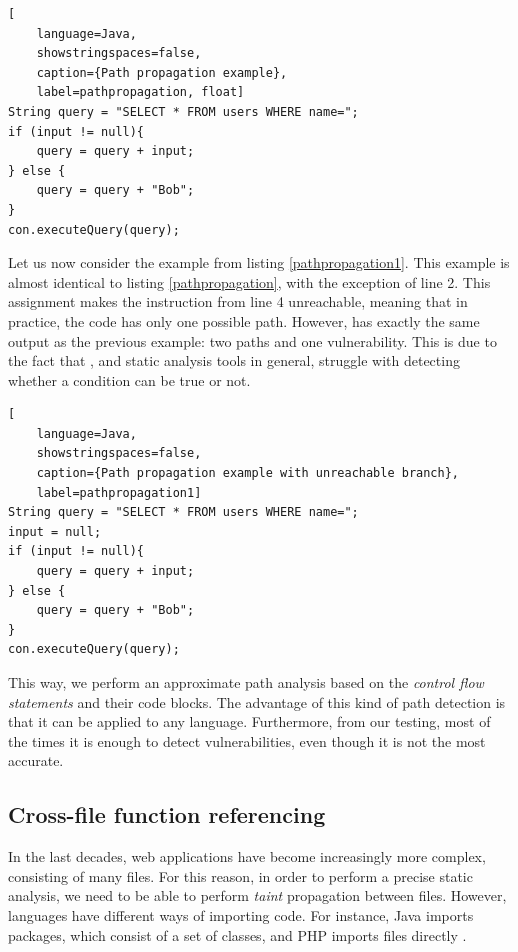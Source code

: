\begin{lstlisting}[
    language=Java,
    showstringspaces=false,
    caption={Path propagation example},
    label=pathpropagation, float] 
String query = "SELECT * FROM users WHERE name=";
if (input != null){
    query = query + input;
} else {
    query = query + "Bob";
}
con.executeQuery(query);
\end{lstlisting}

Let us now consider the example from listing \ref{pathpropagation1}. This example is almost identical to listing \ref{pathpropagation}, with the exception of line 2. This assignment makes the instruction from line 4 unreachable, meaning that in practice, the code has only one possible path. However, \toolname{} has exactly the same output as the previous example: two paths and one vulnerability. This is due to the fact that \toolname{}, and static analysis tools in general, struggle with detecting whether a condition can be true or not.

\begin{lstlisting}[
    language=Java,
    showstringspaces=false,
    caption={Path propagation example with unreachable branch},
    label=pathpropagation1] 
String query = "SELECT * FROM users WHERE name=";
input = null;
if (input != null){
    query = query + input;
} else {
    query = query + "Bob";
}
con.executeQuery(query);
\end{lstlisting}

This way, we perform an approximate path analysis based on the \textit{control flow statements} and their code blocks. The advantage of this kind of path detection is that it can be applied to any language. Furthermore, from our testing, most of the times it is enough to detect vulnerabilities, even though it is not the most accurate.


\subsection{Cross-file function referencing} 
In the last decades, web applications have become increasingly more complex, consisting of many files. For this reason, in order to perform a precise static analysis, we need to be able to perform \textit{taint} propagation between files. However, languages have different ways of importing code. For instance, Java imports packages, which consist of a set of classes, and PHP imports files directly \cite{rountev2004static,hills2014static}. 

